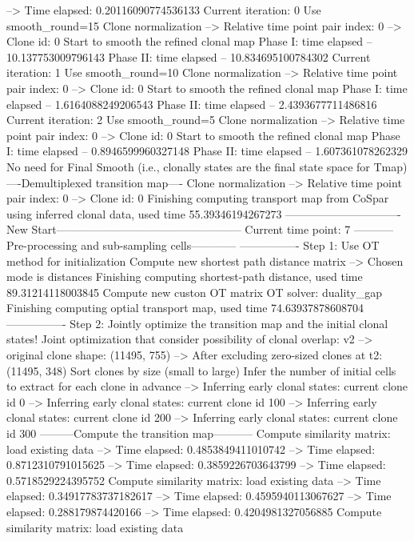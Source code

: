 \documentclass[letterpaper,10pt,english]{sphinxmanual}
\begin{document}
{\begin{sphinxVerbatim}[commandchars=\\\{\}]
--> Time elapsed:  0.20116090774536133
Current iteration: 0
Use smooth\_round=15
Clone normalization
--> Relative time point pair index: 0
--> Clone id: 0
Start to smooth the refined clonal map
Phase I: time elapsed --  10.137753009796143
Phase II: time elapsed --  10.834695100784302
Current iteration: 1
Use smooth\_round=10
Clone normalization
--> Relative time point pair index: 0
--> Clone id: 0
Start to smooth the refined clonal map
Phase I: time elapsed --  1.6164088249206543
Phase II: time elapsed --  2.4393677711486816
Current iteration: 2
Use smooth\_round=5
Clone normalization
--> Relative time point pair index: 0
--> Clone id: 0
Start to smooth the refined clonal map
Phase I: time elapsed --  0.8946599960327148
Phase II: time elapsed --  1.607361078262329
No need for Final Smooth (i.e., clonally states are the final state space for Tmap)
----Demultiplexed transition map----
Clone normalization
--> Relative time point pair index: 0
--> Clone id: 0
Finishing computing transport map from CoSpar using inferred clonal data, used time 55.39346194267273
-------------------------------New Start--------------------------------------------------
Current time point: 7
-----------Pre-processing and sub-sampling cells------------
----------------
Step 1: Use OT method for initialization
Compute new shortest path distance matrix
--> Chosen mode is distances
Finishing computing shortest-path distance, used time 89.31214118003845
Compute new custon OT matrix
OT solver: duality\_gap
Finishing computing optial transport map, used time 74.63937878608704
----------------
Step 2: Jointly optimize the transition map and the initial clonal states!
Joint optimization that consider possibility of clonal overlap: v2
--> original clone shape: (11495, 755)
--> After excluding zero-sized clones at t2: (11495, 348)
Sort clones by size (small to large)
Infer the number of initial cells to extract for each clone in advance
--> Inferring early clonal states: current clone id 0
--> Inferring early clonal states: current clone id 100
--> Inferring early clonal states: current clone id 200
--> Inferring early clonal states: current clone id 300
---------Compute the transition map-----------
Compute similarity matrix: load existing data
--> Time elapsed:  0.4853849411010742
--> Time elapsed:  0.8712310791015625
--> Time elapsed:  0.3859226703643799
--> Time elapsed:  0.5718529224395752
Compute similarity matrix: load existing data
--> Time elapsed:  0.34917783737182617
--> Time elapsed:  0.4595940113067627
--> Time elapsed:  0.288179874420166
--> Time elapsed:  0.4204981327056885
Compute similarity matrix: load existing data

\end{sphinxVerbatim}}
\end{document}
